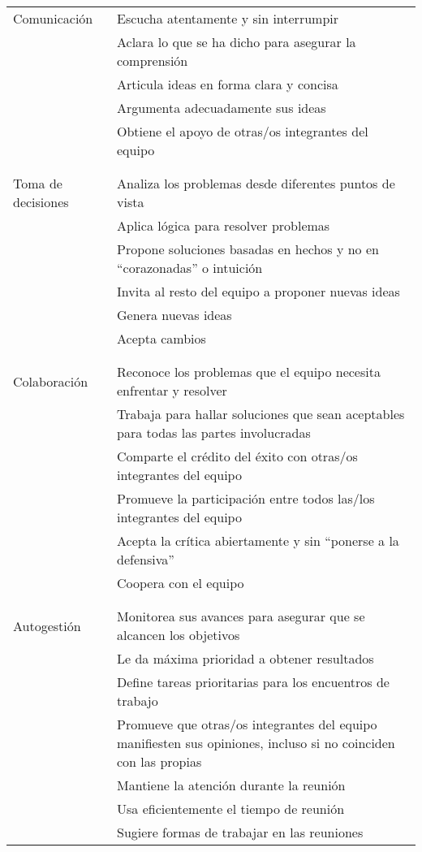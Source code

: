 \noindent
\begin{longtable}{p{}p{}}

  Comunicación
  & Escucha atentamente y sin interrumpir \\
  & Aclara lo que se ha dicho para asegurar la comprensión \\
  & Articula ideas en forma clara y concisa \\
  & Argumenta adecuadamente sus ideas \\
  & Obtiene el apoyo de otras/os integrantes del equipo \\
  \\ [-1.5ex] \hline \\ [-1.5ex]

  Toma de decisiones
  & Analiza los problemas desde diferentes puntos de vista \\
  & Aplica lógica para resolver problemas \\
  & Propone soluciones basadas en hechos y no en ``corazonadas'' o intuición \\
  & Invita al resto del equipo a proponer nuevas ideas \\
  & Genera nuevas ideas \\
  & Acepta cambios \\
  \\ [-1.5ex] \hline \\ [-1.5ex]

  Colaboración
  & Reconoce los problemas que el equipo necesita enfrentar y resolver \\
  & Trabaja para hallar soluciones que sean aceptables para todas las partes involucradas \\
  & Comparte el crédito del éxito con otras/os integrantes del equipo \\
  & Promueve la participación entre todos las/los integrantes del equipo \\
  & Acepta la crítica abiertamente y sin ``ponerse a la defensiva'' \\
  & Coopera con el equipo \\
  \\ [-1.5ex] \hline \\ [-1.5ex]

  Autogestión
  & Monitorea sus avances para asegurar que se alcancen los objetivos \\
  & Le da máxima prioridad a obtener resultados \\
  & Define tareas prioritarias para los encuentros de trabajo \\
  & Promueve que otras/os integrantes del equipo manifiesten sus opiniones, incluso si no coinciden con las propias \\
  & Mantiene la atención durante la reunión \\
  & Usa eficientemente el tiempo de reunión \\
  & Sugiere formas de trabajar en las reuniones \\

\end{longtable}

